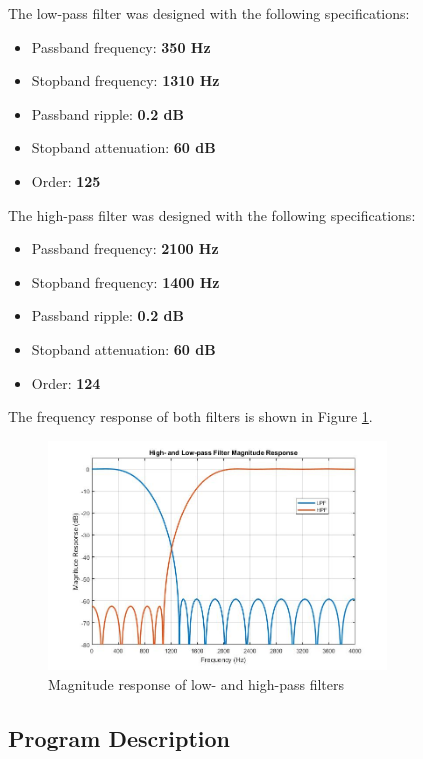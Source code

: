 \documentclass[11pt,pdftex,portrait,letterpaper]{article}
\begin{document}
The low-pass filter was designed with the following specifications: 

\begin{itemize}
\item Passband frequency: \textbf{350 Hz}
\item Stopband frequency: \textbf{1310 Hz}
\item Passband ripple: \textbf{0.2 dB}
\item Stopband attenuation: \textbf{60 dB}
\item Order: \textbf{125}
\end{itemize}

The high-pass filter was designed with the following specifications:

\begin{itemize}
\item Passband frequency: \textbf{2100 Hz}
\item Stopband frequency: \textbf{1400 Hz}
\item Passband ripple: \textbf{0.2 dB}
\item Stopband attenuation: \textbf{60 dB}
\item Order: \textbf{124}
\end{itemize}

The frequency response of both filters is shown in Figure \ref{f:fig1}.

\begin{figure}[h]
\centering
\includegraphics[width=0.8\textwidth]{./magRsp}
\caption{Magnitude response of low- and high-pass filters}
\label{f:fig1}
\end{figure}

\subsection{Program Description}
\end{document}

